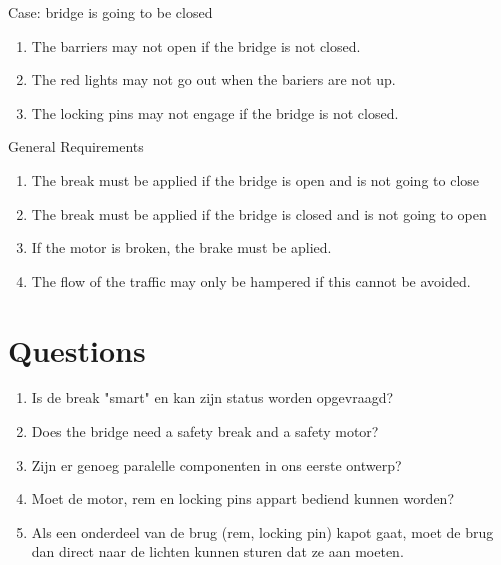 \documentclass[a4paper]{article}
\begin{document}
\noindent Case: bridge is going to be closed
\label{closeBridge}
\begin{enumerate}[resume]

\item{The barriers may not open if the bridge is not closed.}
\item{The red lights may not go out when the bariers are not up.}
\item{The locking pins may not engage if the bridge is not closed.}



\end{enumerate}

\noindent General Requirements

\begin{enumerate}[resume]

\item{The break must be applied if the bridge is open and is not going to close}
\item{The break must be applied if the bridge is closed and is not going to open}
\item{If the motor is broken, the brake must be aplied.}
\item{The flow of the traffic may only be hampered if this cannot be avoided.}

\end{enumerate}

\newpage




\section{Questions}

\begin{enumerate}

\item{Is de break "smart" en kan zijn status worden opgevraagd?}

\item{Does the bridge need a safety break and a safety motor?}

\item{Zijn er genoeg paralelle componenten in ons eerste ontwerp?}

\item{Moet de motor, rem en locking pins appart bediend kunnen worden?}

\item{Als een onderdeel van de brug (rem, locking pin) kapot gaat, moet de brug dan direct naar de lichten kunnen sturen dat ze aan moeten.}

\end{enumerate}
\end{document}
